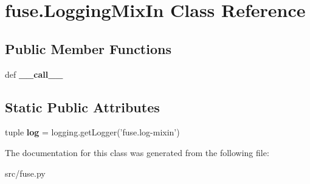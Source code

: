 \hypertarget{classfuse_1_1LoggingMixIn}{\section{fuse.\-Logging\-Mix\-In Class Reference}
\label{classfuse_1_1LoggingMixIn}
}
\subsection*{Public Member Functions}
\begin{DoxyCompactItemize}
\item 
\hypertarget{classfuse_1_1LoggingMixIn_a6c84cd87698901738af26628b7801e82}{def {\bfseries \-\_\-\-\_\-call\-\_\-\-\_\-}}\label{classfuse_1_1LoggingMixIn_a6c84cd87698901738af26628b7801e82}

\end{DoxyCompactItemize}
\subsection*{Static Public Attributes}
\begin{DoxyCompactItemize}
\item 
\hypertarget{classfuse_1_1LoggingMixIn_a86e0fa63f916f123664c84206f69d0e0}{tuple {\bfseries log} = logging.\-get\-Logger('fuse.\-log-\/mixin')}\label{classfuse_1_1LoggingMixIn_a86e0fa63f916f123664c84206f69d0e0}

\end{DoxyCompactItemize}


The documentation for this class was generated from the following file\-:\begin{DoxyCompactItemize}
\item 
src/fuse.\-py\end{DoxyCompactItemize}
